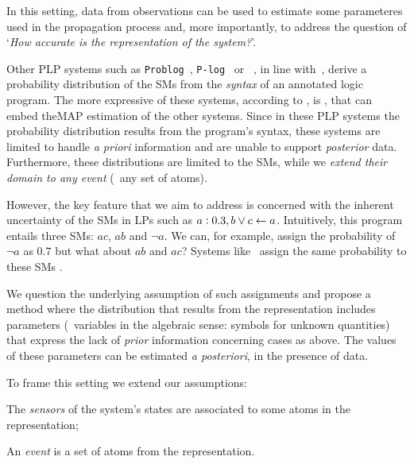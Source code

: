 \documentclass[x11names]{tlp}
\renewcommand{\cite}{\citep}
\begin{document}
In this setting, data from observations can be used to estimate some parameteres used in the propagation process and, more importantly, to address the question of `\emph{How accurate is the representation of the system?}'.%


%
%
Other \ac{PLP} systems such as \texttt{Problog}~\cite{de2007problog}, \texttt{P-log}~\cite{baral2009probabilistic} or \lpmln~\cite{lee2016weighted}, in line with~\cite{kifer1992theory}, derive a probability distribution of the \aclp{SM} from the \textit{syntax} of an annotated logic program.  The more expressive of these systems, according to \cite{lee2017lpmln}, is \lpmln, that can embed the\ac{MAP} estimation of the other systems.
%
%
Since in these \ac{PLP} systems the probability distribution results from the program's syntax, these systems are limited to handle \emph{a priori} information and are unable to support \emph{posterior} data. Furthermore, these distributions are limited to the \acp{SM}, while we \emph{extend their domain to any event} (\ie\ any set of atoms). 

However, the key feature that we aim to address is concerned with the inherent uncertainty of the \acp{SM} in \aclp{LP} such as $a:0.3, b \vee c \leftarrow a$. Intuitively, this program entails three \acp{SM}: $ac$, $ab$ and $\neg a$. We can, for example, assign the probability of $\neg a$ as $0.7$ but what about $ab$ and $ac$? Systems like \lpmln\ assign the same probability to these \acp{SM} \cite{lee2017lpmln,cozman2020joy}.

%
We question the underlying assumption of such assignments and propose a method where the distribution that results from the representation includes parameters (\ie\ variables in the algebraic sense: symbols for unknown quantities) that express the lack of \emph{prior} information concerning cases as above. The values of these parameters can be estimated \emph{a posteriori}, in the presence of data.

To frame this setting we extend our assumptions:
\begin{assumption}\label{asp:sensor.representation.events}
	\begin{description}\tight
		\item[(Sensors)] The \emph{sensors} of the system's states are associated to some atoms in the representation; 
		\item[(Events)] An \emph{event} is a set of atoms from the representation.
	\end{description}
\end{assumption}
\end{document}
